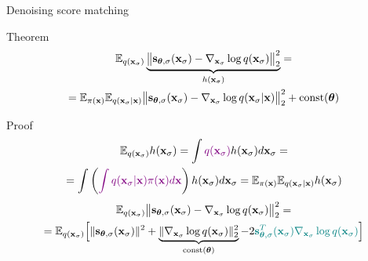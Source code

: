 \begin{frame}{Denoising score matching}
	\begin{block}{Theorem}
	\vspace{-0.5cm}
	\begin{multline*}
		\mathbb{E}_{q(\mathbf{x}_{\sigma})}\underbrace{\bigl\| \mathbf{s}_{\boldsymbol{\theta}, \sigma}(\mathbf{x}_{\sigma}) - \nabla_{\mathbf{x}_{\sigma}} \log q(\mathbf{x}_{\sigma}) \bigr\|^2_2}_{h(\mathbf{x}_{\sigma})} = \\
		= \mathbb{E}_{\pi(\mathbf{x})} \mathbb{E}_{q(\mathbf{x}_{\sigma} | \mathbf{x})}\bigl\| \mathbf{s}_{\boldsymbol{\theta}, \sigma}(\mathbf{x}_{\sigma}) - \nabla_{\mathbf{x}_{\sigma}} \log q(\mathbf{x}_{\sigma} | \mathbf{x}) \bigr\|^2_2 + \text{const}(\boldsymbol{\theta})
	\end{multline*}
	\vspace{-0.5cm}
	\end{block}
	\begin{block}{Proof}
		\vspace{-0.7cm}
		\begin{multline*}
			\mathbb{E}_{q(\mathbf{x}_{\sigma})} h(\mathbf{x}_{\sigma}) = \int {\color{violet}q(\mathbf{x}_{\sigma})} h(\mathbf{x}_{\sigma}) d\mathbf{x}_{\sigma} = \\
			= \int \left({\color{violet}\int q(\mathbf{x}_{\sigma} | \mathbf{x}) \pi(\mathbf{x}) d\mathbf{x}}\right) h(\mathbf{x}_{\sigma}) d\mathbf{x}_{\sigma} =  \mathbb{E}_{\pi(\mathbf{x})} \mathbb{E}_{q(\mathbf{x}_{\sigma} | \mathbf{x})}  h(\mathbf{x}_{\sigma})
		\end{multline*}
		\vspace{-0.7cm}
		{\small
		\begin{multline*}
			\mathbb{E}_{q(\mathbf{x}_{\sigma})}\bigl\| \mathbf{s}_{\boldsymbol{\theta}, \sigma}(\mathbf{x}_{\sigma}) - \nabla_{\mathbf{x}_{\sigma}} \log q(\mathbf{x}_{\sigma}) \bigr\|^2_2 = \\ 
			= \mathbb{E}_{q(\mathbf{x}_{\sigma})} \Bigl[\| \mathbf{s}_{\boldsymbol{\theta}, \sigma}(\mathbf{x}_{\sigma}) \|^2 + \underbrace{\| \nabla_{\mathbf{x}_{\sigma}} \log q(\mathbf{x}_{\sigma}) \|^2_2}_{\text{const}(\boldsymbol{\theta})} - 2 {\color{teal}\mathbf{s}_{\boldsymbol{\theta}, \sigma}^T(\mathbf{x}_{\sigma}) \nabla_{\mathbf{x}_{\sigma}} \log q(\mathbf{x}_{\sigma})} \Bigr]
		\end{multline*}
		}
	\end{block}
\end{frame}
